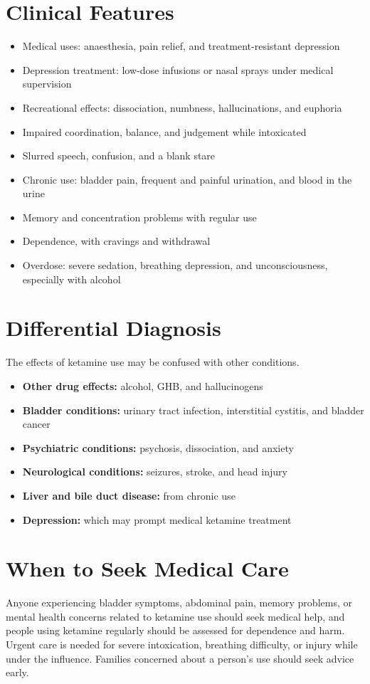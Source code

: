 \section*{Clinical Features}
\begin{itemize}
    \item Medical uses: anaesthesia, pain relief, and treatment-resistant depression
    \item Depression treatment: low-dose infusions or nasal sprays under medical supervision
    \item Recreational effects: dissociation, numbness, hallucinations, and euphoria
    \item Impaired coordination, balance, and judgement while intoxicated
    \item Slurred speech, confusion, and a blank stare
    \item Chronic use: bladder pain, frequent and painful urination, and blood in the urine
    \item Memory and concentration problems with regular use
    \item Dependence, with cravings and withdrawal
    \item Overdose: severe sedation, breathing depression, and unconsciousness, especially with alcohol
\end{itemize}

\section*{Differential Diagnosis}
The effects of ketamine use may be confused with other conditions.
\begin{itemize}
    \item \textbf{Other drug effects:} alcohol, GHB, and hallucinogens
    \item \textbf{Bladder conditions:} urinary tract infection, interstitial cystitis, and bladder cancer
    \item \textbf{Psychiatric conditions:} psychosis, dissociation, and anxiety
    \item \textbf{Neurological conditions:} seizures, stroke, and head injury
    \item \textbf{Liver and bile duct disease:} from chronic use
    \item \textbf{Depression:} which may prompt medical ketamine treatment
\end{itemize}

\section*{When to Seek Medical Care}
Anyone experiencing bladder symptoms, abdominal pain, memory problems, or mental health concerns related to ketamine use should seek medical help, and people using ketamine regularly should be assessed for dependence and harm. Urgent care is needed for severe intoxication, breathing difficulty, or injury while under the influence. Families concerned about a person's use should seek advice early.

